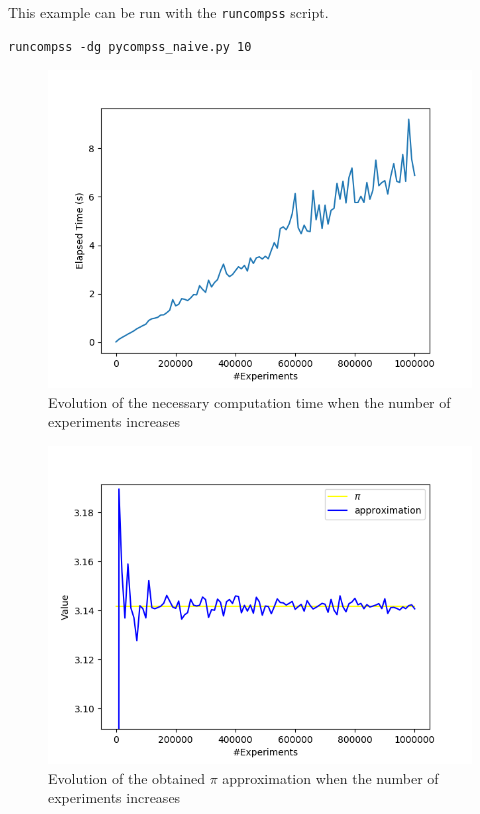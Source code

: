 \inputminted{python}{applications/PI_SQUARE/pycompss_naive.py}

This example can be run with the \verb|runcompss| script.

\begin{verbatim}
runcompss -dg pycompss_naive.py 10
\end{verbatim}



\begin{figure}
\centering
\includegraphics[scale = 0.6]{applications/PI_SQUARE/pi_size_vs_time.png}
\caption{Evolution of the necessary computation time when the number of experiments increases}
\label{fig:pi_size_vs_time}
\end{figure}

\begin{figure}
\centering
\includegraphics[scale = 0.6]{applications/PI_SQUARE/pi_size_vs_value.png}
\caption{Evolution of the obtained $\pi$ approximation when the number of experiments increases}
\label{fig:pi_size_vs_value}
\end{figure}


